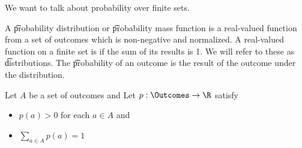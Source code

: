 

We want to talk about probability over finite sets.


A \t{probability distribution} or \t{probability mass function} is a real-valued function from a set of outcomes which is non-negative and normalized.
A real-valued function on a finite set is  if the sum of its results is 1.
We will refer to these as \t{distributions}.
The \t{probability of an outcome}{} is the result of the outcome under the distribution.


Let $A$ be a set of outcomes and
Let $p: \Outcomes \to \R$ satisfy

\begin{itemize}

\item $p(a) > 0$ for each $a \in A$ and
\item $\sum_{a \in A} p(a) = 1$

\end{itemize}
